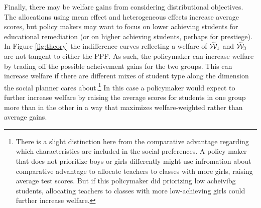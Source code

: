 \documentclass[12pt]{article}
\theoremstyle{definition}
\theoremstyle{definition}
\theoremstyle{definition}
\theoremstyle{definition}
\begin{document}
Finally, there may be welfare gains from considering distributional objectives. The allocations using mean effect and heterogeneous effects increase average scores, but policy makers may want to focus on lower achieving students for educational remediation (or on higher achieving students, perhaps for prestiege). In Figure \ref{fig:theory} the indifference curves reflecting a welfare of $\accentset{\sim}{\mathcal{W}}_1$ and $\accentset{\sim}{\mathcal{W}}_3$ are not tangent to either the PPF. As such, the policymaker can increase welfare by trading off the possible acheivement gains for the two groups. This can increase welfare if there are different mixes of student type along the dimension the social planner cares about.\footnote{There is a slight distinction here from the comparative advantage regarding which characteristics are included in the social preferences. A policy maker that does not prioritize boys or girls differently might use infromation about comparative advantage to allocate teachers to classes with more girls, raising average test scores. But if this policymaker did priorizing low acheivibg students, allocating teachers to classes with more low-achieving girls could further increase welfare.} In this case a policymaker would expect to further increase welfare by raising the average scores for students in one group more than in the other in a way that maximizes welfare-weighted rather than average gains.
\end{document}
